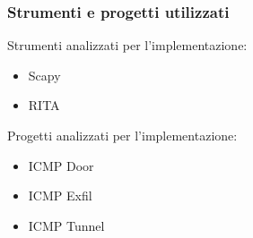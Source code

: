 \begin{frame}
\frametitle{Strumenti e progetti utilizzati} 
Strumenti analizzati per l'implementazione: 
\begin{itemize}  
\item Scapy 
\item RITA 
\end{itemize}
\vspace{2em} 
Progetti analizzati per l'implementazione: 
\begin{itemize} 
\item ICMP Door 
\item ICMP Exfil 
\item ICMP Tunnel 
\end{itemize}
\end{frame}
